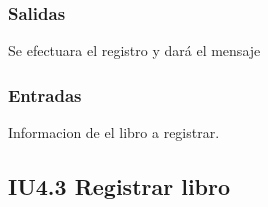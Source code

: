 
\subsubsection{Salidas}
	\begin{Citemize}
		\item Se efectuara el registro y dará el mensaje  
	\end{Citemize}
	
\subsubsection{Entradas}
	\begin{Citemize}
		\item Informacion de el libro a registrar.
	\end{Citemize}

\subsection{IU4.3 Registrar libro}
